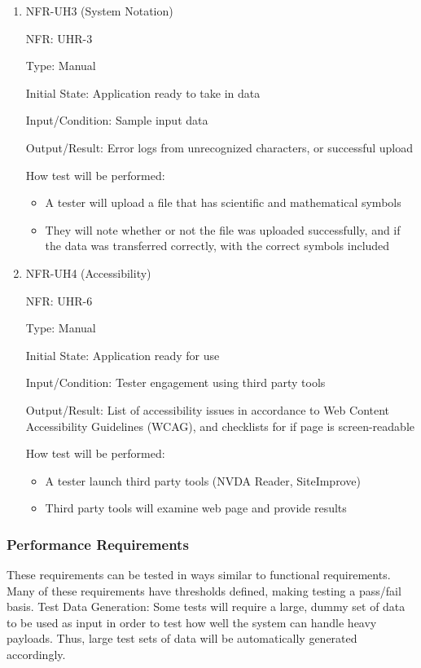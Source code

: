 \documentclass[12pt, titlepage]{article}
\begin{document}
\begin{enumerate}
  \item{NFR-UH3 (System Notation)\\}

  NFR: UHR-3

  Type: Manual

  Initial State: Application ready to take in data

  Input/Condition: Sample input data

  Output/Result: Error logs from unrecognized characters, or successful upload
  
  How test will be performed:
  \begin{itemize}
    \item A tester will upload a file that has scientific and mathematical
    symbols
    \item They will note whether or not the file was uploaded successfully, and
    if the data was transferred correctly, with the correct symbols included
  \end{itemize}

  \item{NFR-UH4 (Accessibility)\\}

  NFR: UHR-6
  
  Type: Manual
  
  Initial State: Application ready for use
  
  Input/Condition: Tester engagement using third party tools
  
  Output/Result: List of accessibility issues in accordance to Web Content
  Accessibility Guidelines (WCAG), and checklists for if page is screen-readable
  
  How test will be performed:
  \begin{itemize}
    \item A tester launch third party tools (NVDA Reader, SiteImprove)
    \item Third party tools will examine web page and provide results
    \end{itemize}
  \end{enumerate}

\subsubsection{Performance Requirements}
These requirements can be tested in ways similar to functional requirements.
Many of these requirements have thresholds defined, making testing a pass/fail
basis. \newline \newline
Test Data Generation: Some tests will require a large, dummy set of data to be
used as input in order to test how well the system can handle heavy payloads.
Thus, large test sets of data will be automatically generated accordingly.
\end{document}
